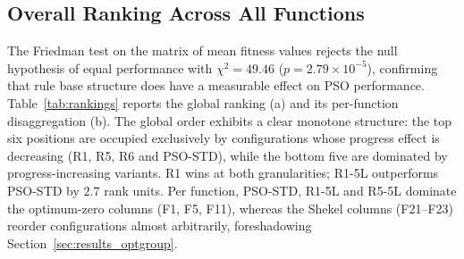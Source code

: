 \documentclass[runningheads]{llncs}
\begin{document}

\subsection{Overall Ranking Across All Functions}\label{sec:results_global}

The Friedman test on the matrix of mean fitness values rejects the null hypothesis of equal performance with $\chi^2 = 49.46$ ($p = 2.79\times 10^{-5}$), confirming that rule base structure does have a measurable effect on PSO performance. Table~\ref{tab:rankings} reports the global ranking (a) and its per-function disaggregation (b). The global order exhibits a clear monotone structure: the top six positions are occupied exclusively by configurations whose progress effect is decreasing (R1, R5, R6 and PSO-STD), while the bottom five are dominated by progress-increasing variants. R1 wins at both granularities; R1-5L outperforms PSO-STD by $2.7$ rank units. Per function, PSO-STD, R1-5L and R5-5L dominate the optimum-zero columns (F1, F5, F11), whereas the Shekel columns (F21--F23) reorder configurations almost arbitrarily, foreshadowing Section~\ref{sec:results_optgroup}.
\end{document}
